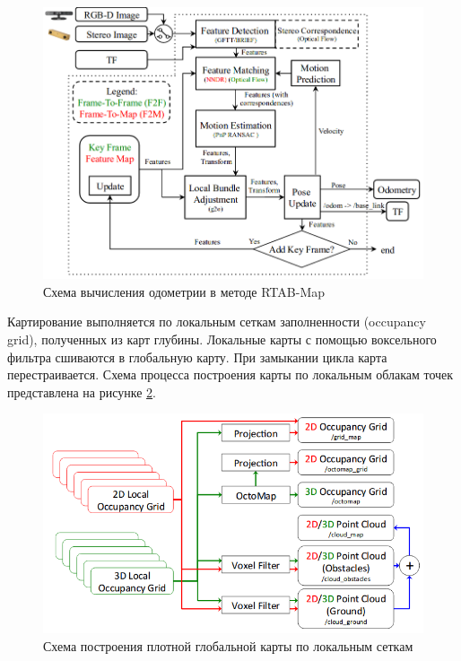\documentclass{mipt-thesis-ms}
\begin{document}
	\begin{figure}
		\centering
		\includegraphics[scale=0.4]{img/rgbd_odometry.png}
		\caption{Схема вычисления одометрии в методе RTAB-Map}
		\label{figurergbdodometry}
	\end{figure}
	
	Картирование выполняется по локальным сеткам заполненности (occupancy grid), полученных из карт глубины. Локальные карты с помощью воксельного фильтра сшиваются в глобальную карту. При замыкании цикла карта перестраивается. Схема процесса построения карты по локальным облакам точек представлена на рисунке \ref{figuremapping}.
	
	\begin{figure}
		\centering
		\includegraphics[scale=0.5]{img/rtabmap_mapping.png}
		\caption{Схема построения плотной глобальной карты по локальным сеткам}
		\label{figuremapping}
	\end{figure}
	
\end{document}
